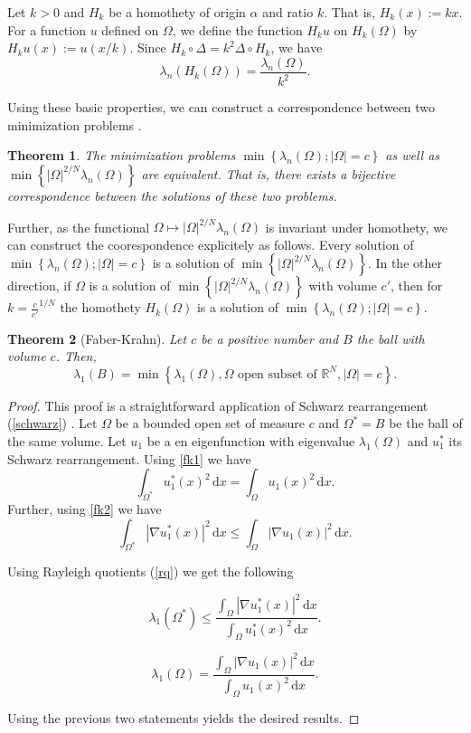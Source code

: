 \documentclass[12pt]{report}
\newtheorem{theorem}{Theorem}[section]
\numberwithin{definition}{section}
\begin{document}
Let $k > 0$ and $H_{k}$ be a homothety of origin $\alpha$ and ratio $k$.
That is, $H_{k}(x) := kx$.
For a function $u$ defined on  $\Omega$, we define the function $H_{k}u$ on $H_{k}(\Omega)$ by $H_{k}u(x) := u(x/k)$.
Since $H_{k} \circ \Delta = k^2 \Delta \circ H_{k}$, we have
\[
\lambda_{n}(H_{k}(\Omega)) = \frac{\lambda_{n}(\Omega)}{k^2}
.\] 

Using these basic properties, we can construct a correspondence between two minimization problems \cite{henrot}.

\begin{theorem} \label{eqmin}
The minimization problems $\min \left\{ \lambda_{n}(\Omega); |\Omega| = c \right\} $ as well as $\min \left\{ |\Omega|^{2/N}  \lambda_{n}(\Omega) \right\} $ are equivalent.
That is, there exists a bijective correspondence between the solutions of these two problems.
\end{theorem}

Further, as the functional $\Omega \mapsto | \Omega |^{2 / N} \lambda_{n}(\Omega) $ is invariant under homothety, we can construct the coorespondence explicitely as follows.
Every solution of $\min \left\{ \lambda_{n}(\Omega); |\Omega| = c \right\} $ is a solution of $\min \left\{ |\Omega|^{2/N}  \lambda_{n}(\Omega) \right\} $.
In the other direction, if $\Omega$ is a solution of $\min \left\{ |\Omega|^{2/N}  \lambda_{n}(\Omega) \right\} $ with volume $c'$, then for $k = \frac{c}{c'}^{1 / N}$ the homothety $H_{k}(\Omega)$ is a solution of $\min \left\{ \lambda_{n}(\Omega); |\Omega| = c \right\} $.



\begin{theorem}[Faber-Krahn] \label{fk}
 Let $c$ be a positive number and $B$ the ball with volume $c$. Then,
 \[
   \lambda_{1}(B) = \min \left\{ \lambda_{1}(\Omega), \Omega \text{ open subset of } \mathbb{R}^{N}, |\Omega| = c \right\} 
 .\] 
\end{theorem}

\begin{proof}
  This proof is a straightforward application of Schwarz rearrangement (\ref{schwarz}) \cite{henrot}.
  Let $\Omega$ be a bounded open set of measure $c$ and $\Omega^* = B$ be the ball of the same volume.
  Let $u_1$ be a en eigenfunction with eigenvalue $\lambda_{1}(\Omega)$ and $u_1^*$ its Schwarz rearrangement.
  Using \ref{fk1} we have
  \[
   \int_{\Omega^{*}} \! u_1^{*}(x)^2 \, \mathrm{d}x = \int_{ \Omega} \! u_1(x)^2 \, \mathrm{d}x
  .\] 
  Further, using \ref{fk2} we have
  \[
     \int_{\Omega^{*}} \! | \nabla u_1^{*}(x) |^2 \, \mathrm{d}x \leq \int_\Omega \! | \nabla u_1(x)  |^2  \, \mathrm{d}x
  .\] 

  Using Rayleigh quotients (\ref{rq}) we get the following

  \[
    \lambda_{1}(\Omega^{*}) \leq \frac{\int_{\Omega} \! | \nabla u_1^{*}(x) |^2 \, \mathrm{d}x }{\int_{\Omega} \! u_1^{*}(x)^2 \, \mathrm{d}x }
  .\] 

  \[
    \lambda_{1}(\Omega) = \frac{\int_{ \Omega} \! | \nabla u_1(x) | ^2 \, \mathrm{d}x }{\int_{ \Omega} \! u_1(x)^2 \, \mathrm{d}x}
  .\] 

  Using the previous two statements yields the desired results.
\end{proof}
\end{document}
